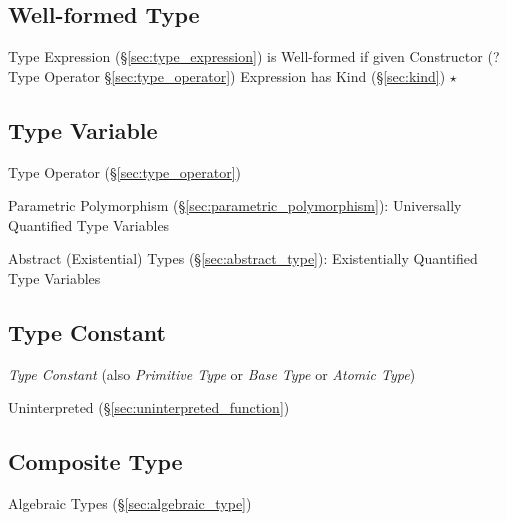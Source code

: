 \subsection{Well-formed Type}\label{sec:wellformed_type}


Type Expression (\S\ref{sec:type_expression}) is Well-formed if given
Constructor (? Type Operator \S\ref{sec:type_operator}) Expression has
Kind (\S\ref{sec:kind}) $\star$



\subsection{Type Variable}\label{sec:type_variable}

Type Operator (\S\ref{sec:type_operator})

Parametric Polymorphism (\S\ref{sec:parametric_polymorphism}):
Universally Quantified Type Variables

Abstract (Existential) Types (\S\ref{sec:abstract_type}):
Existentially Quantified Type Variables



\subsection{Type Constant}\label{sec:type_constant}

\emph{Type Constant} (also \emph{Primitive Type} or \emph{Base Type}
or \emph{Atomic Type})

Uninterpreted (\S\ref{sec:uninterpreted_function}) %



\subsection{Composite Type}\label{sec:composite_type}

Algebraic Types (\S\ref{sec:algebraic_type})



